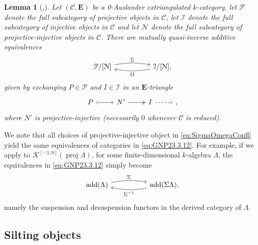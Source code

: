\documentclass[10pt,twoside, a4paper,reqno]{amsart}
\DeclareMathOperator{\add}{add}
\DeclareMathOperator{\proj}{proj}
\newcommand{\Ktwo}{\mathcal{K}^{[-1,0]}}
\newcommand{\calC}{\mathcal{C}}
\newcommand{\E}{\mathbf{E}}
\newtheorem{lemma}[theorem]{Lemma}
\theoremstyle{definition}
\begin{document}
\begin{lemma}[{\cite[Lem. 3.12]{GNP23},\cite[Rem. 4.32 and Cor. 4.35]{PPPP23}}]\label{lem:GNP23.3.12}
    Let $(\calC,\E)$ be a 0-Auslander extriangulated $k$-category, let $\mathcal{P}$ denote the full subcategory of projective objects in $\calC$, let $\mathcal{I}$ denote the full subcategory of injective objects in $\calC$ and let $\mathcal{N}$ denote the full subcategory of projective-injective objects in $\calC$.
    There are mutually quasi-inverse additive equivalences
    \begin{equation}\label{eq:GNP23.3.12}
        \begin{tikzcd}[column sep=5em]
            \mathcal{P}/[\mathcal{N}]\arrow[r,"\Sigma", bend left=10] & \arrow[l,"\Omega", bend left=10] \mathcal{I}/[\mathcal{N}],
        \end{tikzcd}
    \end{equation}
    given by exchanging $P \in \mathcal{P}$ and $I \in \mathcal{I}$ in an $\E$-triangle
    \begin{equation}\label{eq:SigmaOmegaConfl}
        \begin{tikzcd}
            P \arrow[r,tail] & N' \arrow[r,two heads] & I \arrow[r, dashed] & {},
        \end{tikzcd}
    \end{equation}
    where $N'$ is projective-injective (necessarily $0$ whenever $\calC$ is reduced).
\end{lemma}

We note that all choices of projective-injective object in {\cref{eq:SigmaOmegaConfl}} yield the same equivalences of categories in \eqref{eq:GNP23.3.12}.
For example, if we apply  to $\Ktwo(\proj\Lambda)$, for some finite-dimensional $k$-algebra $\Lambda$, the equivalences in \eqref{eq:GNP23.3.12} simply become 
\begin{equation*}
        \begin{tikzcd}[column sep=5em]
            \add(\Lambda)\arrow[r,"{\Sigma}", bend left=10] & \arrow[l,"{\Sigma^{-1}}", bend left=10] \add(\Sigma\Lambda),
        \end{tikzcd}
    \end{equation*}
    namely the suspension and desuspension functors in the derived category of $\Lambda$.
    
   \subsection{Silting objects}
\end{document}
